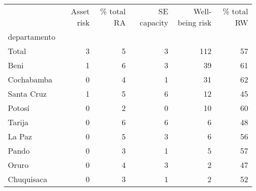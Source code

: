 \begin{tabular}{lrrrrr}
\toprule
{} &  Asset risk &  \% total RA &  SE capacity &  Well-being risk &  \% total RW \\
departamento &             &             &              &                  &             \\
\midrule
Total        &           3 &           5 &            3 &              112 &          57 \\
Beni         &           1 &           6 &            3 &               39 &          61 \\
Cochabamba   &           0 &           4 &            1 &               31 &          62 \\
Santa Cruz   &           1 &           5 &            6 &               12 &          45 \\
Potosí       &           0 &           2 &            0 &               10 &          60 \\
Tarija       &           0 &           6 &            6 &                6 &          48 \\
La Paz       &           0 &           5 &            3 &                6 &          56 \\
Pando        &           0 &           3 &            1 &                5 &          57 \\
Oruro        &           0 &           4 &            3 &                2 &          47 \\
Chuquisaca   &           0 &           3 &            1 &                2 &          52 \\
\bottomrule
\end{tabular}
